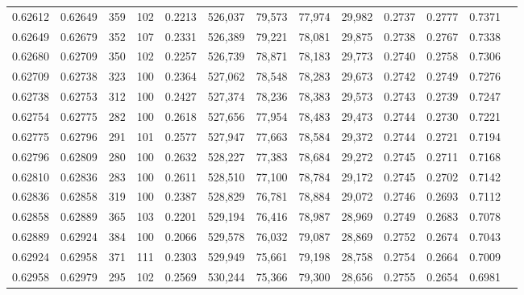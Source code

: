 \begin{tabular}{rrrrrrrrrrrrr}
0.62612 & 0.62649 &   359 & 102 &                                     0.2213 & 526,037 &  79,573 &  77,974 &  29,982 & 0.2737 & 0.2777 & 0.7371 \\
0.62649 & 0.62679 &   352 & 107 &                                     0.2331 & 526,389 &  79,221 &  78,081 &  29,875 & 0.2738 & 0.2767 & 0.7338 \\
0.62680 & 0.62709 &   350 & 102 &                                     0.2257 & 526,739 &  78,871 &  78,183 &  29,773 & 0.2740 & 0.2758 & 0.7306 \\
0.62709 & 0.62738 &   323 & 100 &                                     0.2364 & 527,062 &  78,548 &  78,283 &  29,673 & 0.2742 & 0.2749 & 0.7276 \\
0.62738 & 0.62753 &   312 & 100 &                                     0.2427 & 527,374 &  78,236 &  78,383 &  29,573 & 0.2743 & 0.2739 & 0.7247 \\
0.62754 & 0.62775 &   282 & 100 &                                     0.2618 & 527,656 &  77,954 &  78,483 &  29,473 & 0.2744 & 0.2730 & 0.7221 \\
0.62775 & 0.62796 &   291 & 101 &                                     0.2577 & 527,947 &  77,663 &  78,584 &  29,372 & 0.2744 & 0.2721 & 0.7194 \\
0.62796 & 0.62809 &   280 & 100 &                                     0.2632 & 528,227 &  77,383 &  78,684 &  29,272 & 0.2745 & 0.2711 & 0.7168 \\
0.62810 & 0.62836 &   283 & 100 &                                     0.2611 & 528,510 &  77,100 &  78,784 &  29,172 & 0.2745 & 0.2702 & 0.7142 \\
0.62836 & 0.62858 &   319 & 100 &                                     0.2387 & 528,829 &  76,781 &  78,884 &  29,072 & 0.2746 & 0.2693 & 0.7112 \\
0.62858 & 0.62889 &   365 & 103 &                                     0.2201 & 529,194 &  76,416 &  78,987 &  28,969 & 0.2749 & 0.2683 & 0.7078 \\
0.62889 & 0.62924 &   384 & 100 &                                     0.2066 & 529,578 &  76,032 &  79,087 &  28,869 & 0.2752 & 0.2674 & 0.7043 \\
0.62924 & 0.62958 &   371 & 111 &                                     0.2303 & 529,949 &  75,661 &  79,198 &  28,758 & 0.2754 & 0.2664 & 0.7009 \\
0.62958 & 0.62979 &   295 & 102 &                                     0.2569 & 530,244 &  75,366 &  79,300 &  28,656 & 0.2755 & 0.2654 & 0.6981 \\

\end{tabular}
